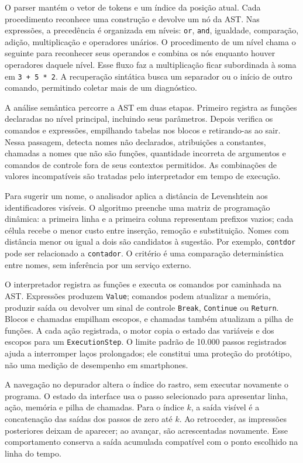 \documentclass[
    12pt
    ,oneside
    ,a4paper
    ,chapter=TITLE
    ,section=TITLE
    ,sumario=abnt-6027-2012]{abntex2}
\begin{document}
O parser mantém o vetor de tokens e um índice da posição atual. Cada procedimento reconhece
uma construção e devolve um nó da AST. Nas expressões, a precedência é organizada em níveis:
\texttt{or}, \texttt{and}, igualdade, comparação, adição, multiplicação e operadores
unários. O procedimento de um nível chama o seguinte para reconhecer seus operandos e
combina os nós enquanto houver operadores daquele nível. Esse fluxo faz a multiplicação
ficar subordinada à soma em \texttt{3 + 5 * 2}. A recuperação sintática busca um separador
ou o início de outro comando, permitindo coletar mais de um diagnóstico.

A análise semântica percorre a AST em duas etapas. Primeiro registra as funções declaradas
no nível principal, incluindo seus parâmetros. Depois verifica os comandos e expressões,
empilhando tabelas nos blocos e retirando-as ao sair. Nessa passagem, detecta nomes não
declarados, atribuições a constantes, chamadas a nomes que não são funções, quantidade
incorreta de argumentos e comandos de controle fora de seus contextos permitidos.
As combinações de valores incompatíveis são tratadas pelo interpretador em tempo de execução.

Para sugerir um nome, o analisador aplica a distância de Levenshtein aos identificadores
visíveis. O algoritmo preenche uma matriz de programação dinâmica: a primeira linha e
a primeira coluna representam prefixos vazios; cada célula recebe o menor custo entre
inserção, remoção e substituição. Nomes com distância menor ou igual a dois são candidatos
à sugestão. Por exemplo, \texttt{contdor} pode ser relacionado a \texttt{contador}.
O critério é uma comparação determinística entre nomes, sem inferência por um serviço externo.

O interpretador registra as funções e executa os comandos por caminhada na AST. Expressões
produzem \texttt{Value}; comandos podem atualizar a memória, produzir saída ou devolver
um sinal de controle \texttt{Break}, \texttt{Continue} ou \texttt{Return}. Blocos e chamadas
empilham escopos, e chamadas também atualizam a pilha de funções. A cada ação registrada,
o motor copia o estado das variáveis e dos escopos para um \texttt{ExecutionStep}.
O limite padrão de 10.000 passos registrados ajuda a interromper laços prolongados; ele
constitui uma proteção do protótipo, não uma medição de desempenho em smartphones.

A navegação no depurador altera o índice do rastro, sem executar novamente o programa.
O estado da interface usa o passo selecionado para apresentar linha, ação, memória e
pilha de chamadas. Para o índice $k$, a saída visível é a concatenação das saídas dos
passos de zero até $k$. Ao retroceder, as impressões posteriores deixam de aparecer;
ao avançar, são acrescentadas novamente. Esse comportamento conserva a saída acumulada
compatível com o ponto escolhido na linha do tempo.
\end{document}
